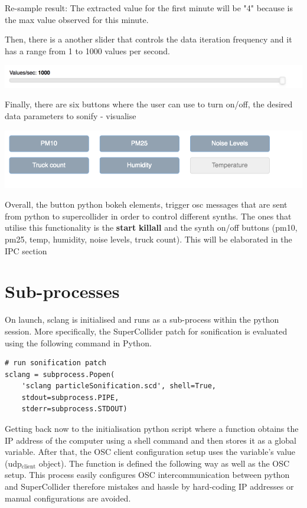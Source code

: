 \documentclass[11pt]{article}
\begin{document}
Re-sample result: The extracted value for the first minute will be "4" because is the max value observed for this minute.

Then, there is a another slider that controls the data iteration frequency and it has a range from 1 to 1000 values per second.

\begin{center}
\includegraphics[width=.9\linewidth]{./values_sec.png}
\end{center}

Finally, there are six buttons where the user can use to turn on/off, the desired data parameters to sonify - visualise

\begin{center}
\includegraphics[width=.9\linewidth]{./synth_onoff.png}
\end{center}

\vspace{0.5em}

Overall, the button python bokeh elements, trigger osc messages that are sent from python to supercollider in order to control different synths.
The ones that utilise this functionality is the \textbf{start} \textbf{killall} and the synth on/off buttons (pm10, pm25, temp, humidity, noise levels, truck count).
This will be elaborated in the IPC section

\section{Sub-processes}
\label{sec:org548b2f6}
On launch, sclang is initialised and runs as a sub-process within the python session.  More specifically, the SuperCollider  patch for sonification is evaluated using the following command in Python.
\begin{verbatim}
# run sonification patch
sclang = subprocess.Popen(
    'sclang particleSonification.scd', shell=True,
    stdout=subprocess.PIPE,
    stderr=subprocess.STDOUT)
\end{verbatim}
Getting back now to the initialisation python script where a function obtains the IP address of the computer using a shell command and then stores it as a global variable.  After that, the OSC client configuration setup uses the variable's value (udp\(_{\text{client}}\) object).  The function is defined the following way as well as the OSC setup.  This process easily configures OSC intercommunication between python and SuperCollider therefore mistakes and hassle by hard-coding IP addresses or manual configurations are avoided.
\end{document}
